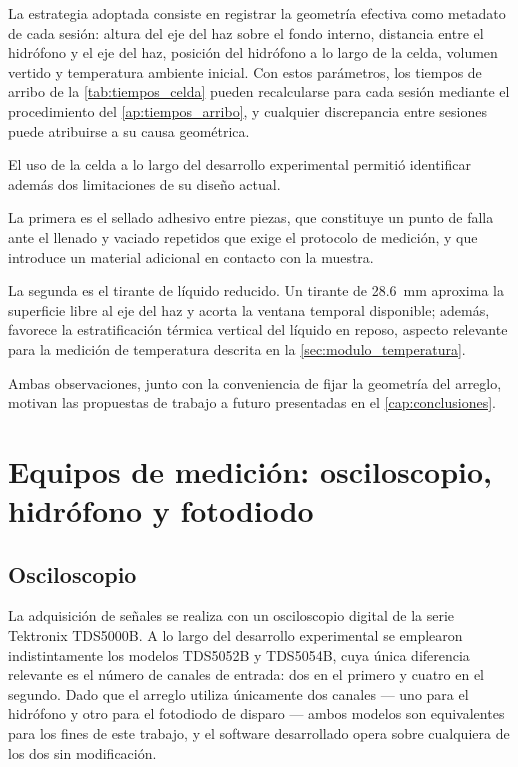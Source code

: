 La estrategia adoptada consiste en registrar la geometría efectiva
como metadato de cada sesión: altura del eje del haz sobre el fondo
interno, distancia entre el hidrófono y el eje del haz, posición del
hidrófono a lo largo de la celda, volumen vertido y temperatura
ambiente inicial. Con estos parámetros, los tiempos de arribo de la
\cref{tab:tiempos_celda} pueden recalcularse para cada sesión
mediante el procedimiento del \cref{ap:tiempos_arribo}, y cualquier
discrepancia entre sesiones puede atribuirse a su causa geométrica.

El uso de la celda a lo largo del desarrollo experimental permitió
identificar además dos limitaciones de su diseño actual.

La primera es el sellado adhesivo entre piezas, que constituye un
punto de falla ante el llenado y vaciado repetidos que exige el
protocolo de medición, y que introduce un material adicional en
contacto con la muestra.

La segunda es el tirante de líquido reducido. Un tirante de
\SI{28.6}{\milli\meter} aproxima la superficie libre al eje del haz y
acorta la ventana temporal disponible; además, favorece la
estratificación térmica vertical del líquido en reposo, aspecto
relevante para la medición de temperatura descrita en la
\cref{sec:modulo_temperatura}.

Ambas observaciones, junto con la conveniencia de fijar la geometría
del arreglo, motivan las propuestas de trabajo a futuro presentadas
en el \cref{cap:conclusiones}.

\section{Equipos de medición: osciloscopio, hidrófono y fotodiodo}
\label{sec:equipos}

\subsection*{Osciloscopio}

La adquisición de señales se realiza con un osciloscopio digital de
la serie Tektronix TDS5000B. A lo largo del desarrollo experimental
se emplearon indistintamente los modelos TDS5052B y TDS5054B, cuya
única diferencia relevante es el número de canales de entrada: dos en
el primero y cuatro en el segundo. Dado que el arreglo utiliza
únicamente dos canales --- uno para el hidrófono y otro para el
fotodiodo de disparo --- ambos modelos son equivalentes para los
fines de este trabajo, y el software desarrollado opera sobre
cualquiera de los dos sin modificación.

